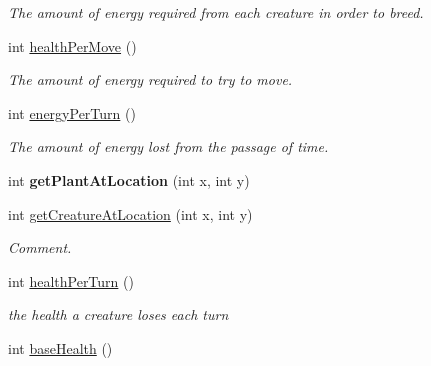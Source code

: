 \begin{DoxyCompactItemize}
\begin{DoxyCompactList}\small\item\em \-The amount of energy required from each creature in order to breed. \end{DoxyCompactList}\item 
\hypertarget{classBaseAI_a0a88ba2664989791479eb6db7701ecd4}{int \hyperlink{classBaseAI_a0a88ba2664989791479eb6db7701ecd4}{health\-Per\-Move} ()}\label{classBaseAI_a0a88ba2664989791479eb6db7701ecd4}

\begin{DoxyCompactList}\small\item\em \-The amount of energy required to try to move. \end{DoxyCompactList}\item 
\hypertarget{classBaseAI_ac8abbaaa98a16af78ade9a88b2e60e72}{int \hyperlink{classBaseAI_ac8abbaaa98a16af78ade9a88b2e60e72}{energy\-Per\-Turn} ()}\label{classBaseAI_ac8abbaaa98a16af78ade9a88b2e60e72}

\begin{DoxyCompactList}\small\item\em \-The amount of energy lost from the passage of time. \end{DoxyCompactList}\item 
\hypertarget{classBaseAI_a69d9a796f6bce6fd0fd867fb431a28f7}{int {\bfseries get\-Plant\-At\-Location} (int x, int y)}\label{classBaseAI_a69d9a796f6bce6fd0fd867fb431a28f7}

\item 
\hypertarget{classBaseAI_a93a9442dc12894d620cfce077f2ee188}{int \hyperlink{classBaseAI_a93a9442dc12894d620cfce077f2ee188}{get\-Creature\-At\-Location} (int x, int y)}\label{classBaseAI_a93a9442dc12894d620cfce077f2ee188}

\begin{DoxyCompactList}\small\item\em \-Comment. \end{DoxyCompactList}\item 
\hypertarget{classBaseAI_a3a42d0a07351f47bf7da03ea554e5cdc}{int \hyperlink{classBaseAI_a3a42d0a07351f47bf7da03ea554e5cdc}{health\-Per\-Turn} ()}\label{classBaseAI_a3a42d0a07351f47bf7da03ea554e5cdc}

\begin{DoxyCompactList}\small\item\em the health a creature loses each turn \end{DoxyCompactList}\item 
\hypertarget{classBaseAI_a300f24da2d5098f308fb0483e1e47ce5}{int \hyperlink{classBaseAI_a300f24da2d5098f308fb0483e1e47ce5}{base\-Health} ()}\label{classBaseAI_a300f24da2d5098f308fb0483e1e47ce5}


\end{DoxyCompactItemize}
